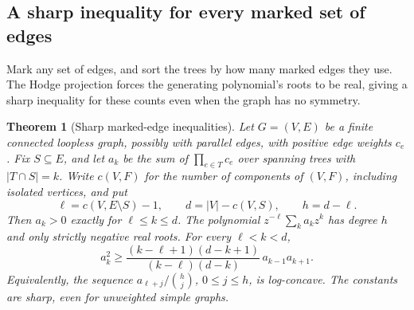 \documentclass[11pt]{article}
\newtheorem{theorem}{Theorem}[section]
\theoremstyle{definition}
\theoremstyle{remark}
\begin{document}
\subsection{A sharp inequality for every marked set of edges}
\label{sec:marked-tree-inequality}

Mark any set of edges, and sort the trees by how many marked edges they use.
The Hodge projection forces the generating polynomial's roots to be real,
giving a sharp inequality for these counts even when the graph has no symmetry.

\begin{theorem}[Sharp marked-edge inequalities]
\label{thm:marked-tree-inequality}
Let $G=(V,E)$ be a finite connected loopless graph, possibly with parallel
edges, with positive edge weights $c_e$.  Fix $S\subseteq E$, and let $a_k$
be the sum of $\prod_{e\in T}c_e$ over spanning trees with $|T\cap S|=k$.
Write $c(V,F)$ for the number of components of $(V,F)$, including isolated
vertices, and put
\[
 \ell=c(V,E\setminus S)-1,\qquad d=|V|-c(V,S),\qquad h=d-\ell.
\]
Then $a_k>0$ exactly for $\ell\le k\le d$.  The polynomial
$z^{-\ell}\sum_k a_kz^k$ has degree $h$ and only strictly negative real
roots.  For every $\ell<k<d$,
\begin{equation}\label{eq:marked-tree-newton}
 a_k^2\ge
 \frac{(k-\ell+1)(d-k+1)}{(k-\ell)(d-k)}\,a_{k-1}a_{k+1}.
\end{equation}
Equivalently, the sequence $a_{\ell+j}/\binom hj$, $0\le j\le h$, is
log-concave.  The constants are sharp, even for unweighted simple graphs.
\end{theorem}
\end{document}
